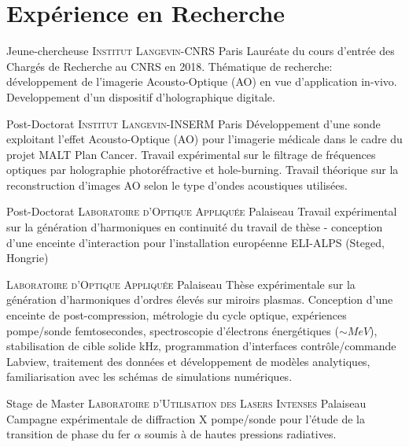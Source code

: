 \documentclass[10pt,a4paper,sans]{moderncv} %
\begin{document}

\section{Expérience en Recherche}

{Jeune-chercheuse}
{\textsc{Institut Langevin-CNRS}}
{Paris}
{}
{Lauréate du cours d'entrée des Chargés de Recherche au CNRS en 2018. Thématique de recherche: développement de l'imagerie Acousto-Optique (AO) en vue d'application in-vivo. Developpement d'un dispositif d'holographique digitale.}


{Post-Doctorat}
{\textsc{Institut Langevin-INSERM}}
{Paris}
{}
{Développement d'une sonde exploitant l'effet Acousto-Optique (AO) pour l'imagerie médicale dans le cadre du projet MALT Plan Cancer. Travail expérimental sur le filtrage de fréquences optiques par holographie photoréfractive et hole-burning. Travail théorique sur la reconstruction d'images AO selon le type d'ondes acoustiques utilisées.}

{Post-Doctorat}
{\textsc{Laboratoire d'Optique Appliquée}}
{Palaiseau}
{}
{Travail expérimental sur la génération d'harmoniques en continuité du travail de thèse - conception d'une enceinte d’interaction pour l'installation européenne ELI-ALPS (Steged, Hongrie)}

{%
\textsc{Laboratoire d'Optique Appliquée}}
{%
Palaiseau}
{}
{%
Thèse expérimentale sur la génération d'harmoniques d'ordres élevés sur miroirs plasmas. Conception d'une enceinte de post-compression, métrologie du cycle optique,  expériences pompe/sonde femtosecondes, spectroscopie d'électrons énergétiques ($\sim MeV$), stabilisation de cible solide kHz, programmation d'interfaces contrôle/commande Labview, traitement des données et développement de modèles analytiques, familiarisation avec les schémas de simulations numériques.
}


{Stage de Master}
{\textsc{Laboratoire d'Utilisation des Lasers Intenses}}
{Palaiseau}
{}
{Campagne expérimentale de diffraction X pompe/sonde pour l'étude de la transition de phase du fer $\alpha$ soumis à de hautes pressions radiatives.}
\end{document}
